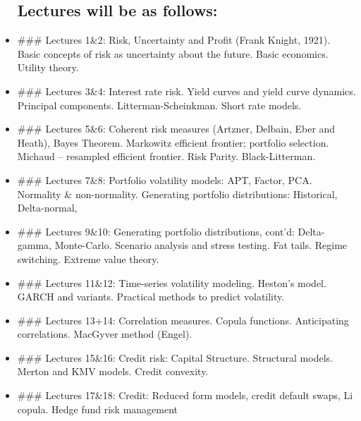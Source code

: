 \documentclass[11pt]{article}
\begin{document}
\begin{itemize}
  \subsection{Lectures will be as
  follows:}\label{lectures-will-be-as-follows}
\item
  \#\#\# Lectures 1\&2: Risk, Uncertainty and Profit (Frank Knight,
  1921). Basic concepts of risk as uncertainty about the future. Basic
  economics. Utility theory.
\item
  \#\#\# Lectures 3\&4: Interest rate risk. Yield curves and yield curve
  dynamics. Principal components. Litterman-Scheinkman. Short rate
  models.
\item
  \#\#\# Lectures 5\&6: Coherent risk measures (Artzner, Delbain, Eber
  and Heath), Bayes Theorem. Markowitz efficient frontier; portfolio
  selection. Michaud -- resampled efficient frontier. Risk Parity.
  Black-Litterman.
\item
  \#\#\# Lectures 7\&8: Portfolio volatility models: APT, Factor, PCA.
  Normality \& non-normality. Generating portfolio distributions:
  Historical, Delta-normal,
\item
  \#\#\# Lectures 9\&10: Generating portfolio distributions, cont'd:
  Delta-gamma, Monte-Carlo. Scenario analysis and stress testing. Fat
  tails. Regime switching. Extreme value theory.
\item
  \#\#\# Lectures 11\&12: Time-series volatility modeling. Heston's
  model. GARCH and variants. Practical methods to predict volatility.
\item
  \#\#\# Lectures 13+14: Correlation measures. Copula functions.
  Anticipating correlations. MacGyver method (Engel).
\item
  \#\#\# Lectures 15\&16: Credit risk: Capital Structure. Structural
  models. Merton and KMV models. Credit convexity.
\item
  \#\#\# Lectures 17\&18: Credit: Reduced form models, credit default
  swaps, Li copula. Hedge fund risk management
\end{itemize}


    
    
    
    
\end{document}
